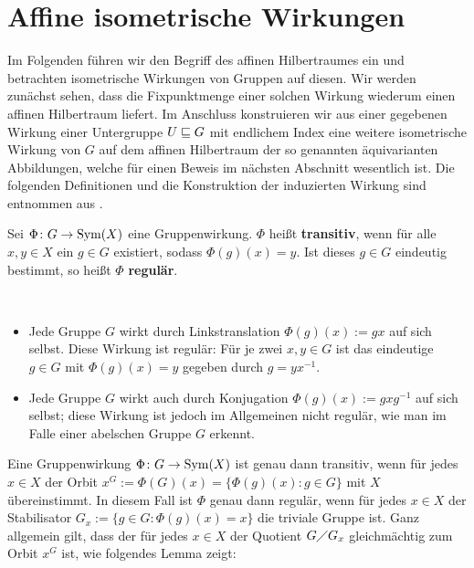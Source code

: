 \section{Affine isometrische Wirkungen}	
\label{sec:aff_isom_wirkung}	
	Im Folgenden führen wir den Begriff des affinen Hilbertraumes ein und betrachten isometrische Wirkungen von Gruppen auf diesen. Wir werden zunächst sehen, dass die Fixpunktmenge einer solchen Wirkung wiederum einen affinen Hilbertraum liefert. Im Anschluss konstruieren wir aus einer gegebenen Wirkung einer Untergruppe $U \sqsubseteq G$ mit endlichem Index eine weitere isometrische Wirkung von $G$ auf dem affinen Hilbertraum der so genannten äquivarianten Abbildungen, welche für einen Beweis im nächsten Abschnitt wesentlich ist. Die folgenden Definitionen und die Konstruktion der induzierten Wirkung sind entnommen aus \cite[S.~74\psq, 91\psq]{BekkaHarpeValette}.
	
\begin{definition}
	Sei $\Phi\colon G \rightarrow \operatorname{Sym}(X)$ eine Gruppenwirkung. $\Phi$ heißt \textbf{transitiv}, wenn für alle $x,y \in X$ ein $g \in G$ existiert, sodass $\Phi(g)(x) = y$. Ist dieses $g \in G$ eindeutig bestimmt, so heißt $\Phi$ \textbf{regulär}.
\end{definition}

\begin{beispiel}
	\mbox{} \\[-1.4cm]
	\begin{itemize}
		\item Jede Gruppe $G$ wirkt durch Linkstranslation $\Phi(g)(x) := gx$ auf sich selbst. Diese Wirkung ist regulär: Für je zwei $x,y \in G$ ist das eindeutige $g \in G$ mit $\Phi(g)(x) = y$ gegeben durch $g = yx^{-1}$.
		\item Jede Gruppe $G$ wirkt auch durch Konjugation $\Phi(g)(x) := gxg^{-1}$ auf sich selbst; diese Wirkung ist jedoch im Allgemeinen nicht regulär, wie man im Falle einer abelschen Gruppe $G$ erkennt.
	\end{itemize}
\end{beispiel}

Eine Gruppenwirkung $\Phi\colon G \rightarrow \operatorname{Sym}(X)$ ist genau dann transitiv, wenn für jedes $x \in X$ der Orbit $x^G := \Phi(G)(x) = \{\Phi(g)(x) : g \in G\}$ mit $X$ übereinstimmt. In diesem Fall ist $\Phi$ genau dann regulär, wenn für jedes $x \in X$ der Stabilisator $G_x := \{g \in G : \Phi(g)(x) = x\}$ die triviale Gruppe ist. Ganz allgemein gilt, dass der für jedes $x \in X$ der Quotient $G \diagup G_x$ gleichmächtig zum Orbit $x^G$ ist, wie folgendes Lemma zeigt:


